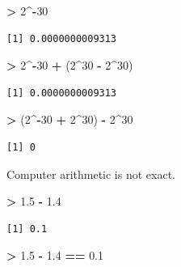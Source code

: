 \documentclass[
]{krantz}
\makeatletter
\newenvironment{Shaded}{\begin{snugshade}}{\end{snugshade}}
\newcommand{\DecValTok}[1]{\textcolor[rgb]{0.06,0.06,0.06}{#1}}
\newcommand{\FloatTok}[1]{\textcolor[rgb]{0.06,0.06,0.06}{#1}}
\newcommand{\NormalTok}[1]{#1}
\newcommand{\OperatorTok}[1]{\textcolor[rgb]{0.43,0.43,0.43}{\textbf{#1}}}
\newcommand{\StringTok}[1]{\textcolor[rgb]{0.5,0.5,0.5}{#1}}
\newenvironment{kframe}{%
\medskip{}
\setlength{\fboxsep}{.8em}
 \def\at@end@of@kframe{}%
 \ifinner\ifhmode%
  \def\at@end@of@kframe{\end{minipage}}%
  \begin{minipage}{\columnwidth}%
 \fi\fi%
 \def\FrameCommand##1{\hskip\@totalleftmargin \hskip-\fboxsep
 \colorbox{shadecolor}{##1}\hskip-\fboxsep
     \hskip-\linewidth \hskip-\@totalleftmargin \hskip\columnwidth}%
 \MakeFramed {\advance\hsize-\width
   \@totalleftmargin\z@ \linewidth\hsize
   \@setminipage}}%
 {\par\unskip\endMakeFramed%
 \at@end@of@kframe}
\renewenvironment{Shaded}{\begin{kframe}}{\end{kframe}}
\makeatother
\begin{document}
\begin{Shaded}
\begin{Highlighting}[]
\OperatorTok{\textgreater{}}\StringTok{ }\DecValTok{2}\OperatorTok{\^{}{-}}\DecValTok{30}
\end{Highlighting}
\end{Shaded}

\begin{verbatim}
[1] 0.0000000009313
\end{verbatim}

\begin{Shaded}
\begin{Highlighting}[]
\OperatorTok{\textgreater{}}\StringTok{ }\DecValTok{2}\OperatorTok{\^{}{-}}\DecValTok{30} \OperatorTok{+}\StringTok{ }\NormalTok{(}\DecValTok{2}\OperatorTok{\^{}}\DecValTok{30} \OperatorTok{{-}}\StringTok{ }\DecValTok{2}\OperatorTok{\^{}}\DecValTok{30}\NormalTok{)}
\end{Highlighting}
\end{Shaded}

\begin{verbatim}
[1] 0.0000000009313
\end{verbatim}

\begin{Shaded}
\begin{Highlighting}[]
\OperatorTok{\textgreater{}}\StringTok{ }\NormalTok{(}\DecValTok{2}\OperatorTok{\^{}{-}}\DecValTok{30} \OperatorTok{+}\StringTok{ }\DecValTok{2}\OperatorTok{\^{}}\DecValTok{30}\NormalTok{) }\OperatorTok{{-}}\StringTok{ }\DecValTok{2}\OperatorTok{\^{}}\DecValTok{30}
\end{Highlighting}
\end{Shaded}

\begin{verbatim}
[1] 0
\end{verbatim}

Computer arithmetic is not exact.

\begin{Shaded}
\begin{Highlighting}[]
\OperatorTok{\textgreater{}}\StringTok{ }\FloatTok{1.5} \OperatorTok{{-}}\StringTok{ }\FloatTok{1.4}
\end{Highlighting}
\end{Shaded}

\begin{verbatim}
[1] 0.1
\end{verbatim}

\begin{Shaded}
\begin{Highlighting}[]
\OperatorTok{\textgreater{}}\StringTok{ }\FloatTok{1.5} \OperatorTok{{-}}\StringTok{ }\FloatTok{1.4} \OperatorTok{==}\StringTok{ }\FloatTok{0.1}
\end{Highlighting}
\end{Shaded}
\end{document}
